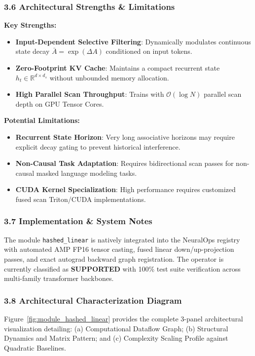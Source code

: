 \subsubsection*{3.6 Architectural Strengths \& Limitations}
\textbf{Key Strengths:}
\begin{itemize}
    \item \textbf{Input-Dependent Selective Filtering}: Dynamically modulates continuous state decay $\bar{A} = \exp(\Delta A)$ conditioned on input tokens.
    \item \textbf{Zero-Footprint KV Cache}: Maintains a compact recurrent state $h_t \in \mathbb{R}^{d \times d_s}$ without unbounded memory allocation.
    \item \textbf{High Parallel Scan Throughput}: Trains with $\mathcal{O}(\log N)$ parallel scan depth on GPU Tensor Cores.
\end{itemize}

\textbf{Potential Limitations:}
\begin{itemize}
    \item \textbf{Recurrent State Horizon}: Very long associative horizons may require explicit decay gating to prevent historical interference.
    \item \textbf{Non-Causal Task Adaptation}: Requires bidirectional scan passes for non-causal masked language modeling tasks.
    \item \textbf{CUDA Kernel Specialization}: High performance requires customized fused scan Triton/CUDA implementations.
\end{itemize}

\subsubsection*{3.7 Implementation \& System Notes}
The module \texttt{hashed\_linear} is natively integrated into the NeuralOps registry with automated AMP FP16 tensor casting, fused linear down/up-projection passes, and exact autograd backward graph registration. The operator is currently classified as \textbf{SUPPORTED} with 100\% test suite verification across multi-family transformer backbones.

\subsubsection*{3.8 Architectural Characterization Diagram}
Figure~\ref{fig:module_hashed_linear} provides the complete 3-panel architectural visualization detailing: (a) Computational Dataflow Graph; (b) Structural Dynamics and Matrix Pattern; and (c) Complexity Scaling Profile against Quadratic Baselines.

